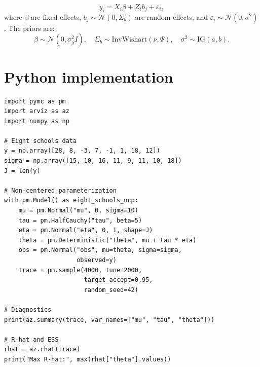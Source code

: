 \begin{definition}
\[
  y_i = X_i \beta + Z_i b_j + \varepsilon_i,
\]
where $\beta$ are fixed effects,
$b_j \sim \mathcal{N}(0, \Sigma_b)$ are random effects, and
$\varepsilon_i \sim \mathcal{N}(0, \sigma^2)$. The priors are:
\[
  \beta \sim \mathcal{N}(0, \sigma_\beta^2 I), \quad
  \Sigma_b \sim \text{InvWishart}(\nu, \Psi), \quad
  \sigma^2 \sim \text{IG}(a, b).
\]
\end{definition}

\section{Python implementation}

\begin{codeblock}[title=\textbf{Eight schools model with PyMC}]
\begin{verbatim}
import pymc as pm
import arviz as az
import numpy as np

# Eight schools data
y = np.array([28, 8, -3, 7, -1, 1, 18, 12])
sigma = np.array([15, 10, 16, 11, 9, 11, 10, 18])
J = len(y)

# Non-centered parameterization
with pm.Model() as eight_schools_ncp:
    mu = pm.Normal("mu", 0, sigma=10)
    tau = pm.HalfCauchy("tau", beta=5)
    eta = pm.Normal("eta", 0, 1, shape=J)
    theta = pm.Deterministic("theta", mu + tau * eta)
    obs = pm.Normal("obs", mu=theta, sigma=sigma,
                    observed=y)
    trace = pm.sample(4000, tune=2000,
                      target_accept=0.95,
                      random_seed=42)

# Diagnostics
print(az.summary(trace, var_names=["mu", "tau", "theta"]))

# R-hat and ESS
rhat = az.rhat(trace)
print("Max R-hat:", max(rhat["theta"].values))
\end{verbatim}
\end{codeblock}

